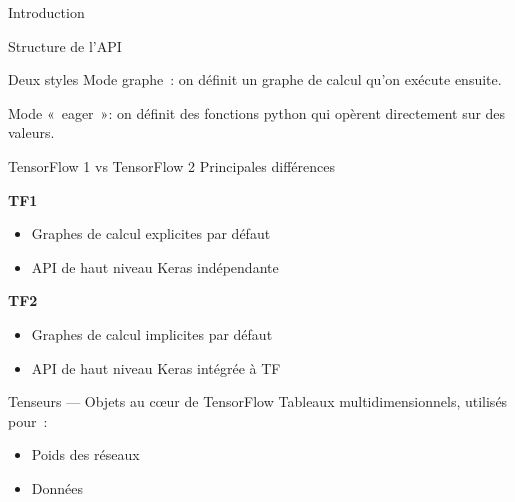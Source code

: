 \begin{frame}{Introduction}
\end{frame}

\begin{frame}{Structure de l'API}
  \centering
\end{frame}

\begin{frame}{Deux styles}
  Mode graphe~: on définit un graphe de calcul qu'on exécute ensuite.

  Mode «~eager~»: on définit des fonctions python qui opèrent directement sur des valeurs.
\end{frame}

\begin{frame}{TensorFlow 1 vs TensorFlow 2}
  \centering
  Principales différences

  \begin{minipage}[l]{0.5\linewidth}
    \centering
    \textbf{TF1}
    \begin{itemize}[<+->]
      \item Graphes de calcul explicites par défaut
      \item API de haut niveau Keras indépendante
    \end{itemize}
  \end{minipage}\hfill
  \begin{minipage}[l]{0.49\linewidth}
    \setcounter{beamerpauses}{1}
    \centering
    \textbf{TF2}
    \begin{itemize}[<+->]
      \item Graphes de calcul implicites par défaut
      \item API de haut niveau Keras intégrée à TF
    \end{itemize}
  \end{minipage}\hfill
\end{frame}

\begin{frame}{Tenseurs --- Objets au cœur de TensorFlow}
  Tableaux multidimensionnels, utilisés pour~:

  \begin{itemize}[<+->]
    \item Poids des réseaux
    \item Données
  \end{itemize}

\end{frame}

